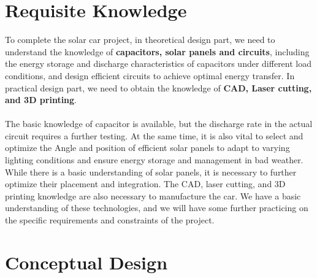 \documentclass[12pt]{article}
\begin{document}
\section{Requisite Knowledge}
To complete the solar car project, in theoretical design part, we need to understand the knowledge of \textbf{capacitors, solar panels and circuits}, 
including the energy storage and discharge characteristics of capacitors under different load conditions, 
and design efficient circuits to achieve optimal energy transfer. In practical design part, we need to obtain the knowledge of \textbf{CAD, Laser cutting, and 3D printing}. 
\\
\\
The basic knowledge of capacitor is available, but the discharge rate in the actual circuit requires a further testing. 
At the same time, it is also vital to select and optimize the Angle and position of efficient solar panels to adapt 
to varying lighting conditions and ensure energy storage and management in bad weather. While there is a basic understanding of solar panels, 
it is necessary to further optimize their placement and integration. The CAD, laser cutting, and 3D printing knowledge are also necessary to manufacture the car.
We have a basic understanding of these technologies, and we will have some further practicing on the specific requirements and constraints of the project. 

\section{Conceptual Design}
\end{document}

